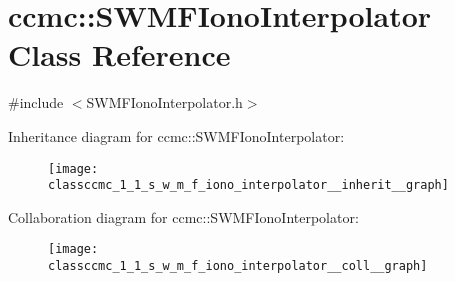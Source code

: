 \hypertarget{classccmc_1_1_s_w_m_f_iono_interpolator}{\section{ccmc\-:\-:S\-W\-M\-F\-Iono\-Interpolator Class Reference}
\label{classccmc_1_1_s_w_m_f_iono_interpolator}
}


{\ttfamily \#include $<$S\-W\-M\-F\-Iono\-Interpolator.\-h$>$}



Inheritance diagram for ccmc\-:\-:S\-W\-M\-F\-Iono\-Interpolator\-:\nopagebreak
\begin{figure}[H]
\begin{center}
\leavevmode
\texttt{[image: classccmc\_1\_1\_s\_w\_m\_f\_iono\_interpolator\_\_inherit\_\_graph]}
\end{center}
\end{figure}


Collaboration diagram for ccmc\-:\-:S\-W\-M\-F\-Iono\-Interpolator\-:\nopagebreak
\begin{figure}[H]
\begin{center}
\leavevmode
\texttt{[image: classccmc\_1\_1\_s\_w\_m\_f\_iono\_interpolator\_\_coll\_\_graph]}
\end{center}
\end{figure}
